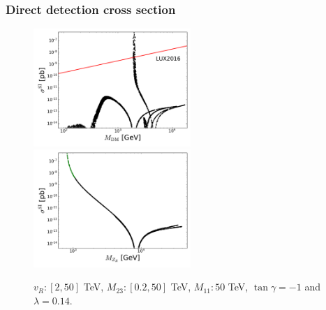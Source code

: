 \documentclass[%
xcolor=dvipsnames,table%
]{beamer}
\begin{document}
 \begin{frame}
    \frametitle{Direct detection cross section}
    \begin{figure}
      \centering
      \includegraphics[width=0.53\textwidth]{MDMvsDDExa5} 
\includegraphics[width=0.53\textwidth]{IIMZRvsDDExa5} 
      \caption{ $v_{R}: [2, 50]$ TeV, $M_{23}:[0.2, 50]$ TeV, $M_{11}: 50$ TeV,  $\tan\gamma=-1$ and $\lambda=0.14$.}
    \end{figure}
\end{frame}
\end{document}
